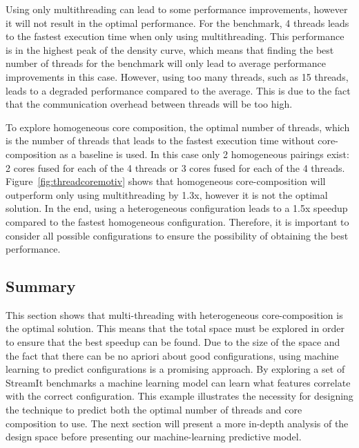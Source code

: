 Using only multithreading can lead to some performance improvements, however it will not result in the optimal performance.
For the  benchmark, 4 threads leads to the fastest execution time when only using multithreading.
This performance is in the highest peak of the density curve, which means that finding the best number of threads for the benchmark will only lead to average performance improvements in this case.
However, using too many threads, such as 15 threads, leads to a degraded performance compared to the average.
This is due to the fact that the communication overhead between threads will be too high.

To explore homogeneous core composition, the optimal number of threads, which is the number of threads that leads to the fastest execution time without core-composition as a baseline is used.
In this case only 2 homogeneous pairings exist: 2 cores fused for each of the 4 threads or 3 cores fused for each of the 4 threads.
Figure~\ref{fig:threadcoremotiv} shows that homogeneous core-composition will outperform only using multithreading by 1.3x, however it is not the optimal solution.
In the end, using a heterogeneous configuration leads to a 1.5x speedup compared to the fastest homogeneous configuration.
Therefore, it is important to consider all possible configurations to ensure the possibility of obtaining the best performance.

\subsection{Summary}
This section shows that multi-threading with heterogeneous core-composition is the optimal solution.
This means that the total space must be explored in order to ensure that the best speedup can be found.
Due to the size of the space and the fact that there can be no apriori about good configurations, using machine learning to predict configurations is a promising approach. %
By exploring a set of StreamIt benchmarks a machine learning model can learn what features correlate with the correct configuration.
This example illustrates the necessity for designing the technique to predict both the optimal number of threads and core composition to use.
The next section will present a more in-depth analysis of the design space before presenting our machine-learning predictive model.
